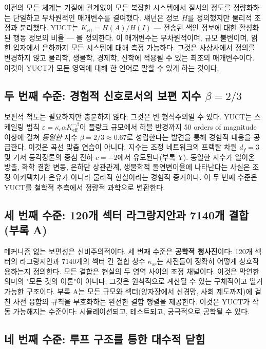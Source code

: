 \documentclass[12pt,a4paper]{article}
\newcommand{\Keff}{K_{\mathrm{eff}}}
\begin{document}
	이전의 모든 체계는 기질에 관계없이 모든 복잡한 시스템에서 질서의 정도를 정량화하는 단일하고 무차원적인 매개변수를 결여했다. 섀넌은 정보 \(H\)를 정의했지만 물리적 조정과 분리했다. YUCT는 \(\Keff = H(A)/H(I)\) — 전송된 색인 정보에 대한 활성화된 행동 정보의 비율 — 을 정의한다. 이 매개변수는 무차원적이며, 규모 불변이며, 얽힌 입자에서 은하까지 모든 시스템에 대해 측정 가능하다. 그것은 사상사에서 정의를 변경하지 않고 물리학, 생물학, 경제학, 신학에 적용될 수 있는 최초의 매개변수이다. 이것이 YUCT가 모든 영역에 대해 한 언어로 말할 수 있게 하는 것이다.
	
	\subsection{두 번째 수준: 경험적 신호로서의 보편 지수 \(\beta = 2/3\)}
	
	보편적 척도는 필요하지만 충분하지 않다; 그것은 빈 형식주의일 수 있다. YUCT는 스케일링 법칙 \(\varepsilon = \kappa_c \alpha \Keff^{-\beta}\)이 플랑크 규모에서 허블 반경까지 50 orders of magnitude 이상에 걸쳐 \emph{동일한} 지수 \(\beta = 2/3 \approx 0.67\)로 성립한다는 발견을 통해 경험적 내용을 공급한다. 이것은 곡선 맞춤 연습이 아니다. 지수는 조정 네트워크의 프랙탈 차원 \(d_f = 3\) 및 기저 등각장론의 중심 전하 \(c = -2\)에서 유도된다(부록 Y). 동일한 지수가 열이온 방출, 화학 결합 변동, 은하단 상관관계, 생물학적 돌연변이율에 나타난다는 사실은 조정 아키텍처가 은유가 아니라 물리적 현실이라는 경험적 증거이다. 이 두 번째 수준은 YUCT를 철학적 추측에서 정량적 과학으로 변환한다.
	
	\subsection{세 번째 수준: 120개 섹터 라그랑지안과 7140개 결합 (부록 A)}
	
	메커니즘 없는 보편성은 신비주의적이다. 세 번째 수준은 \textbf{공학적 청사진}이다: 120개 섹터의 라그랑지안과 7140개의 섹터 간 결합 상수 \(\kappa_{sr}\)는 사전들이 정확히 어떻게 상호작용하는지 정의한다. 모든 결합은 현실의 두 영역 사이의 조정 채널이다. 이것은 막연한 의미의 "모든 것의 이론"이 아니다; 그것은 원칙적으로 계산될 수 있는 구체적이고 열거 가능한 구조이다. 부록 A는 모든 규모와 섹터(양자장에서 신경망, 사회 제도까지)에 걸친 사전 융합의 규칙을 부호화하는 완전한 결합 행렬을 제공한다. 이것은 YUCT가 작동 가능해지는 수준이다: 시뮬레이션되고, 테스트되고, 궁극적으로 공학될 수 있다.
	
	\subsection{네 번째 수준: 루프 구조를 통한 대수적 닫힘}
	
\end{document}
